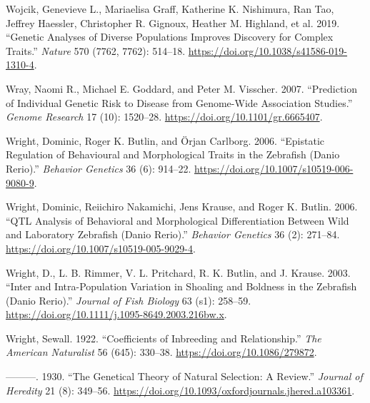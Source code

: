 \documentclass[
]{book}
\newlength{\cslhangindent}
\newlength{\cslentryspacingunit} %
\newenvironment{CSLReferences}[2] %
 {%
  \setlength{\parindent}{0pt}
  \ifodd #1
  \let\oldpar\par
  \def\par{\hangindent=\cslhangindent\oldpar}
  \fi
  \setlength{\parskip}{#2\cslentryspacingunit}
 }%
 {}
\begin{document}
\begin{CSLReferences}{1}{0}
\leavevmode{}%
Wojcik, Genevieve L., Mariaelisa Graff, Katherine K. Nishimura, Ran Tao, Jeffrey Haessler, Christopher R. Gignoux, Heather M. Highland, et al. 2019. {``Genetic Analyses of Diverse Populations Improves Discovery for Complex Traits.''} \emph{Nature} 570 (7762, 7762): 514--18. \url{https://doi.org/10.1038/s41586-019-1310-4}.

\leavevmode{}%
Wray, Naomi R., Michael E. Goddard, and Peter M. Visscher. 2007. {``Prediction of Individual Genetic Risk to Disease from Genome-Wide Association Studies.''} \emph{Genome Research} 17 (10): 1520--28. \url{https://doi.org/10.1101/gr.6665407}.

\leavevmode{}%
Wright, Dominic, Roger K. Butlin, and Örjan Carlborg. 2006. {``Epistatic Regulation of Behavioural and Morphological Traits in the Zebrafish ({Danio} Rerio).''} \emph{Behavior Genetics} 36 (6): 914--22. \url{https://doi.org/10.1007/s10519-006-9080-9}.

\leavevmode{}%
Wright, Dominic, Reiichiro Nakamichi, Jens Krause, and Roger K. Butlin. 2006. {``{QTL Analysis} of {Behavioral} and {Morphological Differentiation Between Wild} and {Laboratory Zebrafish} ({Danio} Rerio).''} \emph{Behavior Genetics} 36 (2): 271--84. \url{https://doi.org/10.1007/s10519-005-9029-4}.

\leavevmode{}%
Wright, D., L. B. Rimmer, V. L. Pritchard, R. K. Butlin, and J. Krause. 2003. {``Inter and Intra-Population Variation in Shoaling and Boldness in the Zebrafish ({Danio} Rerio).''} \emph{Journal of Fish Biology} 63 (s1): 258--59. \url{https://doi.org/10.1111/j.1095-8649.2003.216bw.x}.

\leavevmode{}%
Wright, Sewall. 1922. {``Coefficients of {Inbreeding} and {Relationship}.''} \emph{The American Naturalist} 56 (645): 330--38. \url{https://doi.org/10.1086/279872}.

\leavevmode{}%
---------. 1930. {``The {Genetical Theory} of {Natural Selection}: {A Review}.''} \emph{Journal of Heredity} 21 (8): 349--56. \url{https://doi.org/10.1093/oxfordjournals.jhered.a103361}.


\end{CSLReferences}
\end{document}
